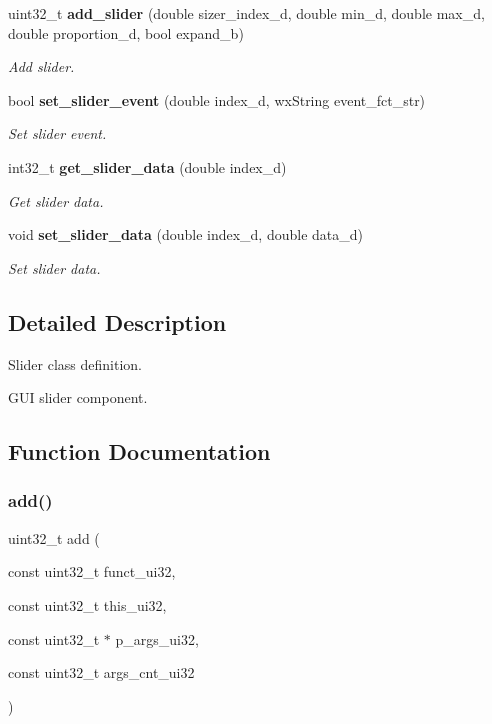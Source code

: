 \begin{DoxyCompactItemize}
uint32\+\_\+t \textbf{ add\+\_\+slider} (double sizer\+\_\+index\+\_\+d, double min\+\_\+d, double max\+\_\+d, double proportion\+\_\+d, bool expand\+\_\+b)
\begin{DoxyCompactList}\small\item\em Add slider. \end{DoxyCompactList}\item 
bool \textbf{ set\+\_\+slider\+\_\+event} (double index\+\_\+d, wx\+String event\+\_\+fct\+\_\+str)
\begin{DoxyCompactList}\small\item\em Set slider event. \end{DoxyCompactList}\item 
int32\+\_\+t \textbf{ get\+\_\+slider\+\_\+data} (double index\+\_\+d)
\begin{DoxyCompactList}\small\item\em Get slider data. \end{DoxyCompactList}\item 
void \textbf{ set\+\_\+slider\+\_\+data} (double index\+\_\+d, double data\+\_\+d)
\begin{DoxyCompactList}\small\item\em Set slider data. \end{DoxyCompactList}\end{DoxyCompactItemize}


\subsection{Detailed Description}
Slider class definition. 

G\+UI slider component.

\subsection{Function Documentation}
\mbox{\label{group___slider_ga490542606fe12f142cd2b00cb1ecaefd}} 
\subsubsection{add()}
{\footnotesize\ttfamily uint32\+\_\+t add (\begin{DoxyParamCaption}\item[{const uint32\+\_\+t}]{funct\+\_\+ui32,  }\item[{const uint32\+\_\+t}]{this\+\_\+ui32,  }\item[{const uint32\+\_\+t $\ast$}]{p\+\_\+args\+\_\+ui32,  }\item[{const uint32\+\_\+t}]{args\+\_\+cnt\+\_\+ui32 }\end{DoxyParamCaption})\hspace{0.3cm}{\ttfamily [static]}}



